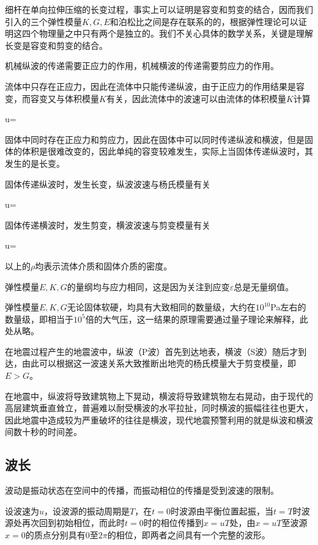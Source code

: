 细杆在单向拉伸压缩的长变过程，事实上可以证明是容变和剪变的结合，因而我们引入的三个弹性模量$K,G,E$和泊松比之间是存在联系的的，根据弹性理论可以证明这四个物理量之中只有两个是独立的。我们不关心具体的数学关系，关键是理解长变是容变和剪变的结合。

机械纵波的传递需要正应力的作用，机械横波的传递需要剪应力的作用。

流体中只存在正应力，因此在流体中只能传递纵波，由于正应力的作用结果是容变，而容变又与体积模量$K$有关，因此流体中的波速可以由流体的体积模量$K$计算
\begin{BoxEquation}[机械纵波在流体中的波速]
    u=
\end{BoxEquation}
固体中同时存在正应力和剪应力，因此在固体中可以同时传递纵波和横波，但是固体的体积是很难改变的，因此单纯的容变较难发生，实际上当固体传递纵波时，其发生的是长变。

固体传递纵波时，发生长变，纵波波速与杨氏模量有关
\begin{BoxEquation}[机械横波在固体中的波速]
    u=
\end{BoxEquation}
固体传递横波时，发生剪变，横波波速与剪变模量有关
\begin{BoxEquation}[机械纵波在固体中的波速]
    u=
\end{BoxEquation}
以上的$\rho$均表示流体介质和固体介质的密度。

弹性模量$E,K,G$的量纲均与应力相同，这是因为关注到应变$\varepsilon$总是无量纲值。

弹性模量$E,K,G$无论固体软硬，均具有大致相同的数量级，大约在$10^{10}$\si{Pa}左右的数量级，即相当于$10^5$倍的大气压，这一结果的原理需要通过量子理论来解释，此处从略。

在地震过程产生的地震波中，纵波（P波）首先到达地表，横波（S波）随后才到达，由此可以根据这一波速关系大致推断出地壳的杨氏模量大于剪变模量，即$E>G$。

在地震中，纵波将导致建筑物上下晃动，横波将导致建筑物左右晃动，由于现代的高层建筑垂直耸立，普遍难以耐受横波的水平拉扯，同时横波的振幅往往也更大，因此地震中造成较为严重破坏的往往是横波，现代地震预警利用的就是纵波和横波间数十秒的时间差。

\subsection{波长}
波动是振动状态在空间中的传播，而振动相位的传播是受到波速的限制。

设波速为$u$，设波源的振动周期是$T$，在$t=0$时波源由平衡位置起振，当$t=T$时波源处再次回到初始相位，而此时$t=0$时的相位传播到$x=uT$处，由$x=uT$至波源$x=0$的质点分别具有$0$至$2\pi$的相位，即两者之间具有一个完整的波形。

